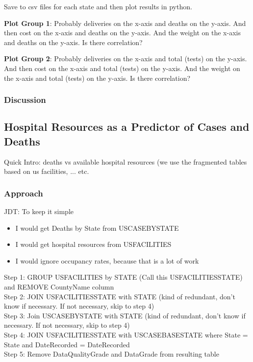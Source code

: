 \documentclass[11pt]{article}
\begin{document}
\noindent
Save to csv files for each state and then plot results in python. 

\noindent
\textbf{Plot Group 1}: Probably deliveries on the x-axis and deaths on the y-axis. And then cost on the x-axis and deaths on the y-axis. And the weight on the x-axis and deaths on the y-axis. Is there correlation?

\noindent
\textbf{Plot Group 2}: Probably deliveries on the x-axis and total (tests) on the y-axis. And then cost on the x-axis and total (tests) on the y-axis. And the weight on the x-axis and total (tests) on the y-axis. Is there correlation?


\subsubsection{Discussion}

\pagebreak

\subsection{Hospital Resources as a Predictor of Cases and Deaths}

\noindent
Quick Intro: deaths vs available hospital resources (we use the fragmented tables based on us facilities,  ... etc.

\subsubsection{Approach}

\noindent
JDT: To keep it simple

\begin{itemize}
    \item I would get Deaths by State from USCASEBYSTATE
    \item I would get hospital resources from USFACILITIES
    \item I would ignore occupancy rates, because that is a lot of work
\end{itemize}

\noindent
Step 1: GROUP USFACILITIES by STATE (Call this USFACILITIESSTATE) and REMOVE CountyName column \\
\noindent
Step 2: JOIN USFACILITIESSTATE with STATE (kind of redundant, don't know if necessary. If not necessary, skip to step 4) \\
\noindent
Step 3: Join USCASEBYSTATE with STATE (kind of redundant, don't know if necessary. If not necessary, skip to step 4) \\
\noindent
Step 4: JOIN USFACILITIESSTATE with USCASEBASESTATE where State = State and DateRecorded = DateRecorded \\
\noindent
Step 5: Remove DataQualityGrade and DataGrade from resulting table \\
\end{document}
